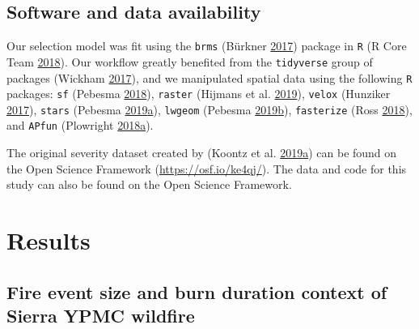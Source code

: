 \documentclass[twoside,12pt,final]{ucthesis-CA2012}
\begin{document}
\begin{ucmainmatter}
\subsection{Software and data
availability}\label{software-and-data-availability-1}

Our selection model was fit using the \texttt{brms} (Bürkner
\protect\hyperlink{ref-burkner2017}{2017}) package in \texttt{R} (R Core
Team \protect\hyperlink{ref-rcoreteam2018}{2018}). Our workflow greatly
benefited from the \texttt{tidyverse} group of packages (Wickham
\protect\hyperlink{ref-wickham2017}{2017}), and we manipulated spatial
data using the following \texttt{R} packages: \texttt{sf} (Pebesma
\protect\hyperlink{ref-pebesma2018}{2018}), \texttt{raster} (Hijmans et
al. \protect\hyperlink{ref-hijmans2019}{2019}), \texttt{velox} (Hunziker
\protect\hyperlink{ref-hunziker2017}{2017}), \texttt{stars} (Pebesma
\protect\hyperlink{ref-pebesma2019b}{2019}\protect\hyperlink{ref-pebesma2019b}{a}),
\texttt{lwgeom} (Pebesma
\protect\hyperlink{ref-pebesma2019a}{2019}\protect\hyperlink{ref-pebesma2019a}{b}),
\texttt{fasterize} (Ross \protect\hyperlink{ref-ross2018}{2018}), and
\texttt{APfun} (Plowright
\protect\hyperlink{ref-plowright2018a}{2018}\protect\hyperlink{ref-plowright2018a}{a}).

The original severity dataset created by (Koontz et al.
\protect\hyperlink{ref-koontz2019}{2019}\protect\hyperlink{ref-koontz2019}{a})
can be found on the Open Science Framework
(\url{https://osf.io/ke4qj/}). The data and code for this study can also
be found on the Open Science Framework.

\section{Results}\label{results-2}

\subsection{Fire event size and burn duration context of Sierra YPMC
wildfire}\label{fire-event-size-and-burn-duration-context-of-sierra-ypmc-wildfire}


\end{ucmainmatter}
\end{document}
